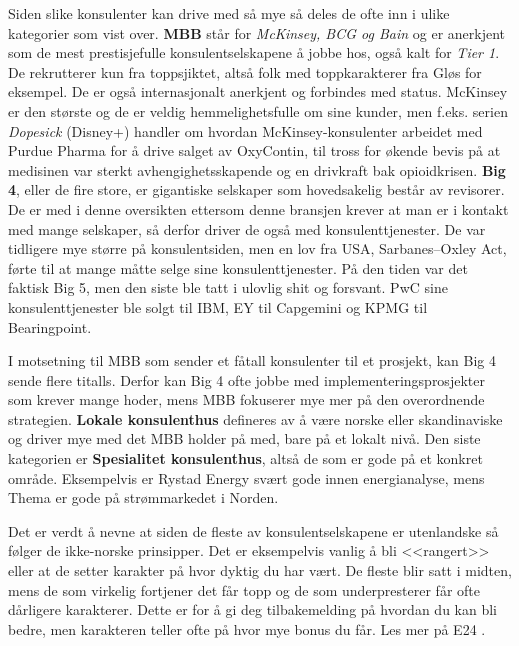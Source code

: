 Siden slike konsulenter kan drive med så mye så deles de ofte inn i ulike kategorier som vist over. \textbf{MBB} står for \textit{McKinsey, BCG og Bain} og er anerkjent som de mest prestisjefulle konsulentselskapene å jobbe hos, også kalt for \textit{Tier 1}. De rekrutterer kun fra toppsjiktet, altså folk med toppkarakterer fra Gløs for eksempel. De er også internasjonalt anerkjent og forbindes med status. McKinsey er den største og de er veldig hemmelighetsfulle om sine kunder, men f.eks. serien \textit{Dopesick} (Disney+) handler om hvordan McKinsey-konsulenter arbeidet med Purdue Pharma for å drive salget av OxyContin, til tross for økende bevis på at medisinen var sterkt avhengighetsskapende og en drivkraft bak opioidkrisen. \textbf{Big 4}, eller de fire store, er gigantiske selskaper som hovedsakelig består av revisorer. De er med i denne oversikten ettersom denne bransjen krever at man er i kontakt med mange selskaper, så derfor driver de også med konsulenttjenester. De var tidligere mye større på konsulentsiden, men en lov fra USA, Sarbanes–Oxley Act, førte til at mange måtte selge sine konsulenttjenester. På den tiden var det faktisk Big 5, men den siste ble tatt i ulovlig shit og forsvant. PwC sine konsulenttjenester ble solgt til IBM, EY til Capgemini og KPMG til Bearingpoint. 

I motsetning til MBB som sender et fåtall konsulenter til et prosjekt, kan Big 4 sende flere titalls. Derfor kan Big 4 ofte jobbe med implementeringsprosjekter som krever mange hoder, mens MBB fokuserer mye mer på den overordnende strategien. \textbf{Lokale konsulenthus} defineres av å være norske eller skandinaviske og driver mye med det MBB holder på med, bare på et lokalt nivå. Den siste kategorien er \textbf{Spesialitet konsulenthus}, altså de som er gode på et konkret område. Eksempelvis er Rystad Energy svært gode innen energianalyse, mens Thema er gode på strømmarkedet i Norden. 

Det er verdt å nevne at siden de fleste av konsulentselskapene er utenlandske så følger de ikke-norske prinsipper. Det er eksempelvis vanlig å bli <<rangert>> eller at de setter karakter på hvor dyktig du har vært. De fleste blir satt i midten, mens de som virkelig fortjener det får topp og de som underpresterer får ofte dårligere karakterer. Dette er for å gi deg tilbakemelding på hvordan du kan bli bedre, men karakteren teller ofte på hvor mye bonus du får. Les mer på E24 \cite{e24_talentfabrikkene}.

